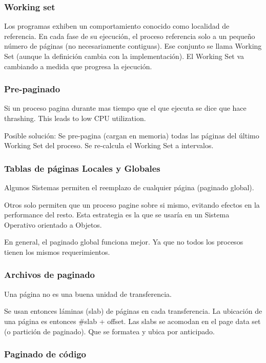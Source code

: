 \documentclass[a4paper, twoside]{article}
\begin{document}
\subsubsection{Working set}

Los programas exhiben un comportamiento conocido como localidad de referencia.
En cada fase de su ejecución, el proceso referencia solo a un pequeño número de
páginas (no necesariamente contiguas).
Ese conjunto se llama Working Set (aunque la definición cambia con la
implementación). El Working Set va cambiando a medida que progresa la ejecución.

\subsubsection{Pre-paginado}

Si un proceso pagina durante mas tiempo que el que ejecuta se dice que hace
thrashing. This leads to low CPU utilization.

Posible solución: Se pre-pagina (cargan en memoria) todas las páginas del
último Working Set del proceso. Se re-calcula el Working Set a intervalos.

\subsubsection{Tablas de páginas Locales y Globales}

Algunos Sistemas permiten el reemplazo de cualquier página (paginado global).

Otros solo permiten que un proceso pagine sobre si mismo, evitando efectos en
la performance del resto.
Esta estrategia es la que se usaría en un Sistema Operativo orientado a Objetos.

En general, el paginado global funciona mejor.
Ya que no todos los procesos tienen los mismos requerimientos.

\subsubsection{Archivos de paginado}

Una página no es una buena unidad de transferencia.

Se usan entonces láminas (slab) de páginas en cada transferencia.
La ubicación de una página es entonces \#slab + offset.
Las slabs se acomodan en el page data set (o partición de paginado).
Que se formatea y ubica por anticipado.

\subsubsection{Paginado de código}
\end{document}
